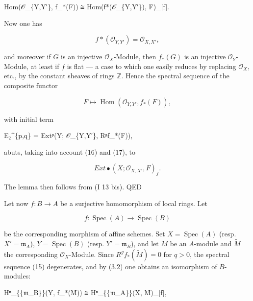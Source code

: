 \documentclass[
  11pt,
  a4paper,
]{book}
\newenvironment{Shaded}{}{}
\newcommand{\NormalTok}[1]{#1}
\begin{document}
\begin{Shaded}
\begin{Highlighting}[]
\NormalTok{Hom(𝒪\_\{Y,Y′\}, f\_*(F)) ≅ Hom(f*(𝒪\_\{Y,Y′\}), F)\_[f].}
\end{Highlighting}
\end{Shaded}

Now one has

\[ f*(\mathcal{O}_{Y,Y'}) = \mathcal{O}_{X,X'}, \]

and moreover if \(G\) is an injective \(\mathcal{O}_{X}\)-Module, then
\(f_{*}(G)\) is an injective \(\mathcal{O}_{Y}\)-Module, at least if
\(f\) is flat --- a case to which one easily reduces by replacing
\(\mathcal{O}_{X}\), etc., by the constant sheaves of rings
\(\mathbb{Z}\). Hence the spectral sequence of the composite functor

\[ F \mapsto \operatorname{Hom}(\mathcal{O}_{Y,Y'}, f_{*}(F)), \]

with initial term

\begin{Shaded}
\begin{Highlighting}[]
\NormalTok{E₂\^{}\{p,q\} = Extᵖ(Y; 𝒪\_\{Y,Y′\}, Rᵍf\_*(F)),}
\end{Highlighting}
\end{Shaded}

abuts, taking into account (16) and (17), to

\[ Ext\bullet(X; \mathcal{O}_{X,X'}, F)_{f}. \]

The lemma then follows from (I 13 bis). QED

Let now \(f: B \to A\) be a surjective homomorphism of local rings. Let

\[ f: \operatorname{Spec}(A) \to \operatorname{Spec}(B) \]

be the corresponding morphism of affine schemes. Set
\(X = \operatorname{Spec}(A)\) (resp. \(X' = {\mathfrak{m}_{A}}\)), \(Y
= \operatorname{Spec}(B)\) (resp. \(Y' = {\mathfrak{m}_{B}}\)), and let
\(M\) be an \(A\)-module and \(\tilde{M}\) the corresponding
\(\mathcal{O}_{X}\)-Module. Since \(R^{g}f_{*}(\tilde{M}) = 0\) for
\(q > 0\), the spectral sequence (15) degenerates, and by (3.2) one
obtains an isomorphism of \(B\)-modules:

\begin{Shaded}
\begin{Highlighting}[]
\NormalTok{Hⁿ\_\{\{𝔪\_B\}\}(Y, f\_*(M̃)) ≅ Hⁿ\_\{\{𝔪\_A\}\}(X, M̃)\_[f],}
\end{Highlighting}
\end{Shaded}
\end{document}
